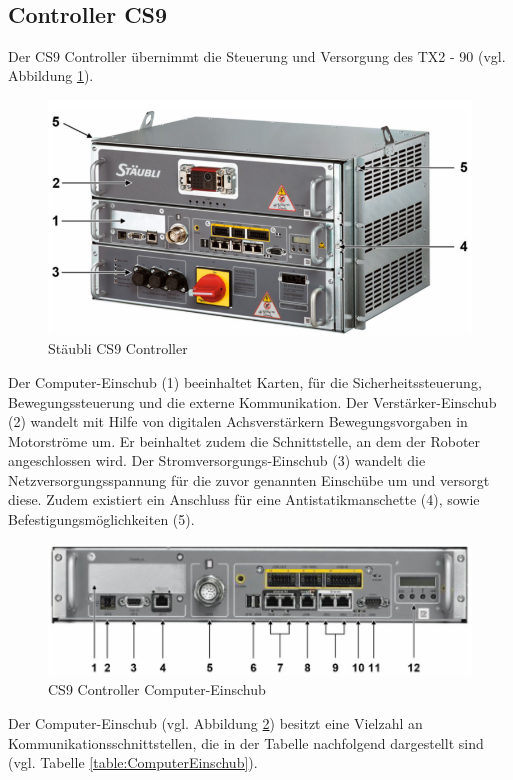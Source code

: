\documentclass[ a4paper,
                oneside,
                toc=bibliography,
                toc=listof
                ]{scrbook}
\begin{document}
   	\\
   	\subsection{Controller CS9}
   	Der CS9 Controller übernimmt die Steuerung und Versorgung des TX2 - 90 (vgl. Abbildung \ref{fig:CS9}).
   	\begin{figure}[!ht]
   		\centering
   		\includegraphics[width=0.70\linewidth]{./images/CS9.png}
   		\caption{Stäubli CS9 Controller \cite{CS9}} 
   		\label{fig:CS9}
   	\end{figure}
   	Der Computer-Einschub (1) beeinhaltet Karten, für die Sicherheitssteuerung, Bewegungssteuerung und die externe Kommunikation. Der Verstärker-Einschub (2) wandelt mit Hilfe von digitalen Achsverstärkern Bewegungsvorgaben in Motorströme um. Er beinhaltet zudem die Schnittstelle, an dem der Roboter angeschlossen wird. Der Stromversorgungs-Einschub (3) wandelt die Netzversorgungsspannung für die zuvor genannten Einschübe um und versorgt diese. Zudem existiert ein Anschluss für eine Antistatikmanschette (4), sowie Befestigungsmöglichkeiten (5).
   	\begin{figure}[!ht]
   		\centering
   		\includegraphics[width=0.70\linewidth]{./images/ComputerEinschub.png}
   		\caption{CS9 Controller Computer-Einschub \cite{CS9}} 
   		\label{fig:ComputerEinschub}
   	\end{figure}
   	Der Computer-Einschub (vgl. Abbildung \ref{fig:ComputerEinschub}) besitzt eine Vielzahl an Kommunikationsschnittstellen, die in der Tabelle nachfolgend dargestellt sind (vgl. Tabelle \ref{table:ComputerEinschub}).
\end{document}
